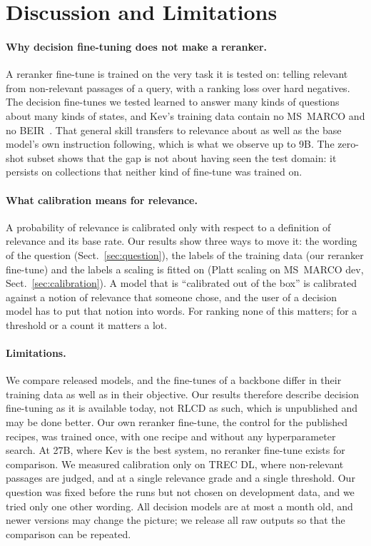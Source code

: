 \section{Discussion and Limitations}
\label{sec:discussion}

\paragraph{Why decision fine-tuning does not make a reranker.}
A reranker fine-tune is trained on the very task it is tested on: telling relevant from non-relevant passages of a
query, with a ranking loss over hard negatives. The decision fine-tunes we tested learned to answer many kinds of
questions about many kinds of states, and Kev's training data contain no MS~MARCO and no BEIR~\cite{KevCards}. That
general skill transfers to relevance about as well as the base model's own instruction following, which is what we
observe up to 9B. The zero-shot subset shows that the gap is not about having seen the test domain: it persists on
collections that neither kind of fine-tune was trained on.

\paragraph{What calibration means for relevance.}
A probability of relevance is calibrated only with respect to a definition of relevance and its base rate. Our
results show three ways to move it: the wording of the question (Sect.~\ref{sec:question}), the labels of the
training data (our reranker fine-tune) and the labels a scaling is fitted on (Platt scaling on MS~MARCO dev,
Sect.~\ref{sec:calibration}). A model that is ``calibrated out of the box'' is calibrated against a notion of
relevance that someone chose, and the user of a decision model has to put that notion into words. For ranking none of
this matters; for a threshold or a count it matters a lot.

\paragraph{Limitations.}
We compare released models, and the fine-tunes of a backbone differ in their training data as well as in their
objective. Our results therefore describe decision fine-tuning as it is available today, not RLCD as such, which is
unpublished and may be done better. Our own reranker fine-tune, the control for the published
recipes, was trained once, with one recipe and without any hyperparameter search. At 27B, where Kev is the best
system, no reranker fine-tune exists for comparison. We measured calibration only on TREC
DL, where non-relevant passages are judged, and at a single relevance grade and a single threshold. Our question was
fixed before the runs but not chosen on development data, and we tried only one other wording. All decision models
are at most a month old, and newer versions may change the picture; we release all raw outputs so that the comparison
can be repeated.
